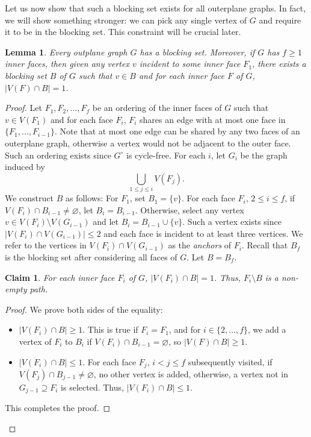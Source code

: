 \documentclass{patmorin}
\let\emptyset\varnothing
\newcommand{\wdual}[1]{#1^{\circ}}
\newtheorem{lemma}[theorem]{Lemma}
\newtheorem{claim}{Claim}[theorem]
\begin{document}

Let us now show that such a blocking set exists for all outerplane graphs. In fact, we will show something stronger:  we can pick any single vertex of $G$ and require it to be in the blocking set. This constraint will be crucial later.

\begin{lemma}
 Every outplane graph $G$ has a blocking set. Moreover, if $G$ has
 $f\ge 1$ inner faces, 
 then given any vertex $v$ incident to some inner face $F_1$, there exists a blocking set $B$ of $G$ such that $v \in B$ and for each inner face $F$ of $G$, $|V(F) \cap B|=1$.
 \label{lem:blocking_out}
\end{lemma}
\begin{proof}
 Let $F_1,F_2,\ldots,F_{f}$ be an ordering of the inner faces of $G$ such that $v \in V(F_1)$ and for each face $F_i$, $F_i$ shares an edge with at most one face in $\{F_1,\ldots,F_{i-1}\}$. Note that at most one edge can be shared by any two faces of an outerplane graph, otherwise a vertex would not be adjacent to the outer face. 
 Such an ordering exists since $\wdual{G}$ is cycle-free. For each $i$, let $G_i$ be the graph induced by
 \begin{equation}
  \bigcup_{1 \leq j \leq i}V(F_j).
 \end{equation}
 We construct $B$ as follows: For $F_1$, set $B_1=\{v\}$. For each face $F_i$, $2 \leq i \leq f$, if $V(F_i) \cap B_{i-1} \not= \emptyset$, let $B_i = B_{i-1}$. Otherwise, select any vertex $v \in V(F_i) \setminus V(G_{i-1})$ and let $B_i = B_{i-1} \cup \{v\}$. Such a vertex exists since $|V(F_i) \cap V(G_{i-1})|\leq2$ and each face is incident to at least three vertices. We refer to the vertices in $V(F_i) \cap V(G_{i-1})$ as the \emph{anchors} of $F_i$. Recall that $B_f$ is the blocking set after considering all faces of $G$. Let $B=B_{f}$.
 
 \begin{claim}
  For each inner face $F_i$ of $G$, $|V(F_i) \cap B|=1$. Thus, $F_i \setminus B$ is a non-empty path.
  \label{claim:blocking_out_1}
 \end{claim}
 
 \begin{proof}
  We prove both sides of the equality:
  \begin{itemize}
   \item $|V(F_i) \cap B|\geq1$. This is true if $F_i=F_1$, and for $i \in \{2,\ldots,f\}$, we add a vertex of $F_i$ to $B_i$ if $V(F_i) \cap B_{i-1}=\emptyset$, so $|V(F) \cap B|\geq1$.
   \item $|V(F_i) \cap B|\leq1$. For each face $F_j$, $i < j \leq f$ subsequently visited, if $V(F_j) \cap B_{j-1} \not= \emptyset$, no other vertex is added, otherwise, a vertex not in $G_{j-1}\supseteq F_i$ is selected. Thus, $|V(F_i) \cap B|\leq1$. 
  \end{itemize}
  This completes the proof.
 \end{proof}
 

\end{proof}
\end{document}
